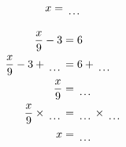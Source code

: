 \documentclass[12pt]{article}
\newcounter{minipagecount}
\begin{document}
\begin{multicols}{2}
\begin{minipage}[t]{0.45\textwidth}
\begin{align*}
        x &= \dotuline{\hspace{5mm}}\\
    \end{align*}
\end{minipage} %
\noindent{(\theminipagecount)}\hspace{0.1mm} %
\begin{minipage}[t]{0.45\textwidth} %
    \vspace{-26pt}  %
    \raggedright %
    \begin{align*} %
        \frac{x}{9} - 3 &= 6\\
        \frac{x}{9} - 3 + \dotuline{\hspace{5mm}} &= 6 + \dotuline{\hspace{5mm}}\\
        \frac{x}{9} &= \dotuline{\hspace{5mm}}\\
        \frac{x}{9} \times\dotuline{\hspace{5mm}} &= \dotuline{\hspace{5mm}} \times\dotuline{\hspace{5mm}}\\
        x &= \dotuline{\hspace{5mm}}\\
    \end{align*}
\end{minipage} %
\noindent{(\theminipagecount)}\hspace{0.1mm} %
\begin{minipage}[t]{0.45\textwidth} %
    \vspace{-26pt}  %

\end{minipage}
\end{multicols}
\end{document}
